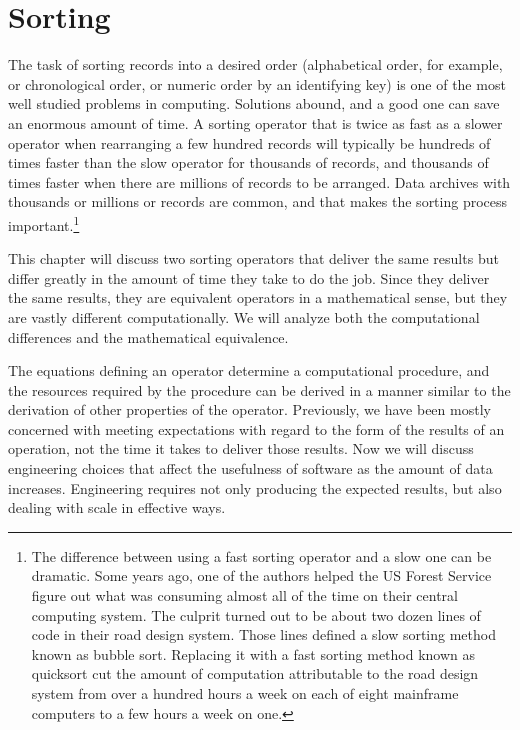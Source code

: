 \chapter{Sorting}
\label{ch:sorting}

The task of sorting records into a desired order
(alphabetical order, for example, or chronological order,
or numeric order by an identifying key)
is one of the most well studied problems in computing.
Solutions abound,
and a good one can save an enormous amount of time.
A sorting operator that is twice as fast
as a slower operator when rearranging a few hundred records
will typically be hundreds of times faster than the slow operator
for thousands of records, and thousands of times faster
when there are millions of records to be arranged.
Data archives with thousands or millions or records
are common, and that makes the sorting process important.\footnote{The
difference between using a fast sorting operator and a slow one
can be dramatic.
\label{bubble-vs-quicksort-example}
Some years ago, one of the authors helped the US Forest Service
figure out what was consuming almost all of the time
on their central computing system.
The culprit turned out to be about two dozen lines
of code in their road design system.
Those lines defined a slow sorting method
known as bubble sort. Replacing it with a fast sorting
method known as quicksort cut the amount of computation
attributable to the road design system from over a hundred
hours a week on each of eight mainframe computers to a few hours
a week on one.}

This chapter will discuss two sorting operators that
deliver the same results but differ
greatly in the amount of time they take to do the job.
Since they deliver the same results,
they are equivalent operators in a mathematical sense,
but they are vastly different computationally.
We will analyze both the computational differences
and the mathematical equivalence.

The equations defining an operator
determine a computational procedure, and the
resources required by the procedure can be derived
in a manner similar to the derivation of other properties
of the operator.
Previously, we have been mostly concerned with meeting
expectations with regard to the form of the results
of an operation, not the time it takes to deliver those results.
Now we will discuss engineering choices that affect the usefulness of
software as the amount of data increases.
Engineering requires not only producing the expected
results, but also dealing with scale in effective ways.

